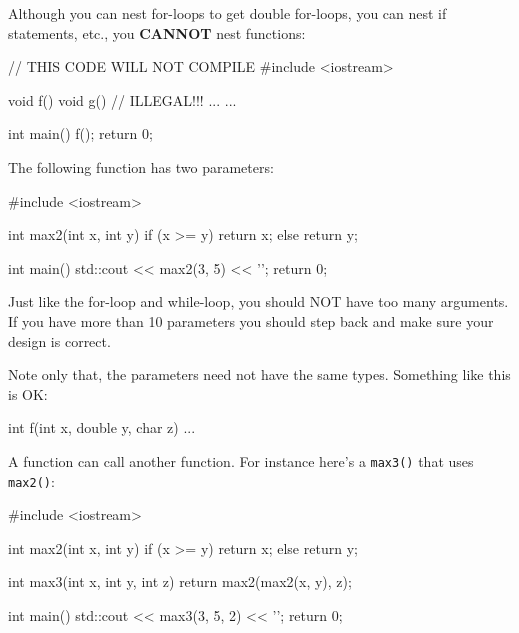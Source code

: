 Although you can nest for-loops to get double for-loops, you can nest if
statements, etc., you \textbf{CANNOT} nest functions:

\begin{consolethree}[escapeinside=||]
// THIS CODE WILL NOT COMPILE
#include <iostream>

void f()
{
    void g() // ILLEGAL!!!
    {
        ...
    }
    ...
}

int main()
{
    f();
    return 0;
}
\end{consolethree}


\newpage{}

The following function has two parameters:

\begin{consolethree}[escapeinside=||]
#include <iostream>

int max2(int x, int y)
{
    if (x >= y)
    {
        return x;
    }
    else
    {
        return y;
    }
}

int main()
{
    std::cout << max2(3, 5) << '\n';
    return 0;
}
\end{consolethree}

Just like the for-loop and while-loop, you should NOT have too many arguments. If you have more than 10 parameters you should step back and make sure your design is correct.

Note only that, the parameters need not have the same types. Something like this is OK:

\begin{consolethree}[escapeinside=||]
int f(int x, double y, char z)
{
    ...
}
\end{consolethree}


\newpage{}







\newpage{}

A function can call another function. For instance here's a \texttt{max3()} that uses \texttt{max2()}:

\begin{consolethree}[escapeinside=||]
#include <iostream>

int max2(int x, int y)
{
    if (x >= y)
    {
        return x;
    }
    else
    {
        return y;
    }
}

int max3(int x, int y, int z)
{
    return max2(max2(x, y), z);
}

int main()
{
    std::cout << max3(3, 5, 2) << '\n';
    return 0;
}
\end{consolethree}

